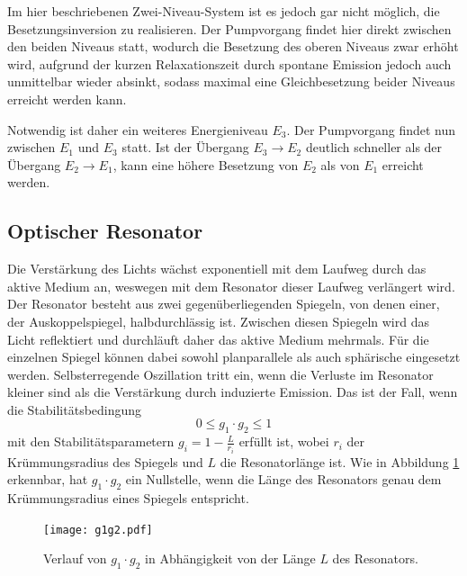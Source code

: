 Im hier beschriebenen Zwei-Niveau-System ist es jedoch gar nicht möglich, die Besetzungsinversion zu realisieren.
Der Pumpvorgang findet hier direkt zwischen den beiden Niveaus statt, wodurch die Besetzung des oberen Niveaus zwar erhöht wird,
aufgrund der kurzen Relaxationszeit durch spontane Emission jedoch auch unmittelbar wieder absinkt, sodass 
maximal eine Gleichbesetzung beider Niveaus erreicht werden kann.

Notwendig ist daher ein weiteres Energieniveau $E_3$. Der Pumpvorgang findet nun zwischen $E_1$ und $E_3$ statt.
Ist der Übergang $E_3 \rightarrow E_2$ deutlich schneller als der Übergang $E_2 \rightarrow E_1$, 
kann eine höhere Besetzung von $E_2$ als von $E_1$ erreicht werden.


\subsection*{Optischer Resonator}
Die Verstärkung des Lichts wächst exponentiell mit dem Laufweg durch das aktive Medium an, weswegen mit dem 
Resonator dieser Laufweg verlängert wird. Der Resonator besteht aus zwei gegenüberliegenden Spiegeln, von denen einer, der Auskoppelspiegel, 
halbdurchlässig ist. Zwischen diesen Spiegeln wird das Licht reflektiert und durchläuft daher das aktive Medium mehrmals.
Für die einzelnen Spiegel können dabei sowohl planparallele als auch sphärische eingesetzt werden. 
Selbsterregende Oszillation tritt ein, wenn die Verluste im Resonator kleiner sind als die Verstärkung durch 
induzierte Emission. Das ist der Fall, wenn die Stabilitätsbedingung
\begin{equation}
    \label{eq:stabil}
    0 \leq g_1 \cdot g_2 \leq 1 
\end{equation}
mit den Stabilitätsparametern $g_i = 1 - \frac{L}{r_i}$ erfüllt ist, wobei $r_i$ der Krümmungsradius des Spiegels
und $L$ die Resonatorlänge ist.
Wie in Abbildung \ref{fig:tfig3} erkennbar, hat $g_1 \cdot g_2$ ein Nullstelle, wenn die Länge des Resonators
genau dem Krümmungsradius eines Spiegels entspricht.
\FloatBarrier
    \begin{figure}[h]
    \centering
    \texttt{[image: g1g2.pdf]}
    \caption{Verlauf von $g_1 \cdot g_2$ in Abhängigkeit von der Länge $L$ des Resonators.}
    \label{fig:tfig3}
    \end{figure}
\FloatBarrier
\noindent


